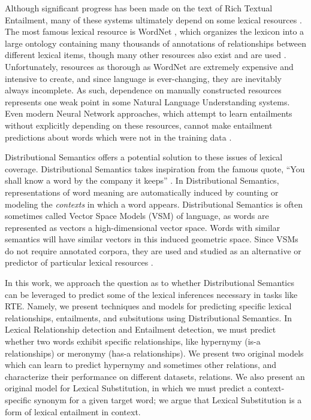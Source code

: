 \documentclass[12pt]{article}
\begin{document}
Although significant progress has been made on the text of
Rich Textual Entailment, many of these systems ultimately depend on some lexical
resources
\cite{beltagy:2014:semeval,bjerva:2014:semeval,lai:2014:semeval,marelli:2014:semeval,beltagy:2016:cl}.
The most famous lexical resource is WordNet \cite{miller:1995:acm}, which organizes the lexicon into a
large ontology containing many thousands of annotations of relationships
between different lexical items, though many other resources also exist
and are used \cite{baker:1998:acl,baroni:2011:gems,baroni:2012:eacl,ganitkevitch:2013:naacl,jurgens:2012:semeval,levy:2014:conll,turney:2015:nle}.
Unfortunately,
resources as thorough as WordNet are extremely expensive and intensive to
create, and since language is ever-changing, they are inevitably always
incomplete. As such, dependence on manually constructed resources represents one weak point in some Natural Language Understanding
systems. Even modern Neural Network approaches, which attempt to learn
entailments without explicitly depending on these resources, cannot make
entailment predictions about words which were not in the training data
\cite{bowman:2015:emnlp,cheng:2016:arxiv}.

Distributional Semantics offers a potential solution to these issues of lexical
coverage. Distributional Semantics takes inspiration from the famous quote,
``You shall know a word by the company it keeps'' \cite{firth:1957:la}. In
Distributional Semantics, representations of word meaning are automatically
induced by counting or modeling the {\em contexts} in which a word appears.
Distributional Semantics is often sometimes called Vector Space Models (VSM) of
language, as words are represented as vectors a high-dimensional vector space.
Words with similar semantics will have similar vectors in this induced
geometric space. Since VSMs do not require annotated corpora, they are used and
studied as an alternative or predictor of particular lexical resources \cite{needcite}.

In this work, we approach the question as to whether Distributional Semantics
can be leveraged to predict some of the lexical inferences necessary in tasks
like RTE. Namely, we present techniques and models for predicting specific
lexical relationships, entailments, and subsitutions using Distributional
Semantics. In Lexical Relationship detection and Entailment detection, we must
predict whether two words exhibit specific relationships, like hypernymy (is-a
relationships) or meronymy (has-a relationships). We present two original
models which can learn to predict hypernymy and sometimes other relations,
and characterize their performance on different datasets, relations. We also
present an original model for Lexical Substitution, in which we must predict a
context-specific synonym for a given target word; we argue that Lexical
Substitution is a form of lexical entailment in context.
\end{document}
